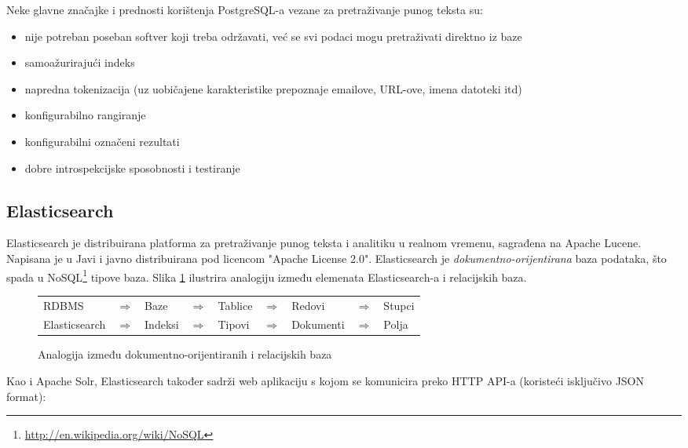 \documentclass[a4paper,twoside,12pt]{scrreprt}
\begin{document}
Neke glavne značajke i prednosti korištenja PostgreSQL-a vezane za pretraživanje punog teksta su:

\begin{itemize}
  \item nije potreban poseban softver koji treba održavati, već se svi podaci mogu pretraživati direktno iz baze
  \item samoažurirajući indeks
  \item napredna tokenizacija (uz uobičajene karakteristike prepoznaje emailove, URL-ove, imena datoteki itd)
  \item konfigurabilno rangiranje
  \item konfigurabilni označeni rezultati
  \item dobre introspekcijske sposobnosti i testiranje
\end{itemize}

\subsection{Elasticsearch}

Elasticsearch je distribuirana platforma za pretraživanje punog teksta i analitiku u realnom vremenu, sagrađena na Apache Lucene. Napisana je u Javi i javno distribuirana pod licencom "Apache License 2.0". Elasticsearch je \textit{dokumentno-orijentirana} baza podataka, što spada u NoSQL\footnote{\url{http://en.wikipedia.org/wiki/NoSQL}} tipove baza. Slika \ref{elasticsearch} ilustrira analogiju između elemenata Elasticsearch-a i relacijskih baza.

\begin{figure}[H]
  \centering
  \begin{tabular}{lllllllll}
    RDBMS         & $\Rightarrow$ & Baze    & $\Rightarrow$ & Tablice & $\Rightarrow$ & Redovi    & $\Rightarrow$ & Stupci \\
    Elasticsearch & $\Rightarrow$ & Indeksi & $\Rightarrow$ & Tipovi  & $\Rightarrow$ & Dokumenti & $\Rightarrow$ & Polja  \\
  \end{tabular}
  \caption{Analogija između dokumentno-orijentiranih i relacijskih baza}
  \label{elasticsearch}
\end{figure}

Kao i Apache Solr, Elasticsearch također sadrži web aplikaciju s kojom se komunicira preko HTTP API-a (koristeći isključivo JSON format):
\end{document}
